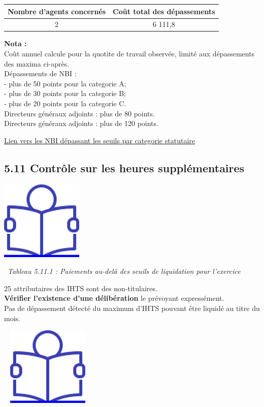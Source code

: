 \begin{longtable}[]{@{}cc@{}}
\toprule
Nombre d'agents concernés & Coût total des dépassements\tabularnewline
\midrule
\endhead
2 & 6 111,8\tabularnewline
\bottomrule
\end{longtable}

\textbf{Nota :}\\
Coût annuel calcule pour la quotite de travail observée, limité aux
dépassements des maxima ci-après.\\
Dépassements de NBI :\\
- plus de 50 points pour la categorie A;\\
- plus de 30 points pour la categorie B;\\
- plus de 20 points pour la categorie C.\\
Directeurs généraux adjoints : plus de 80 points.\\
Directeurs généraux adjoints : plus de 120 points.

\href{../Bases/Reglementation/NBI.cat.irreg.csv}{Lien vers les NBI
dépassant les seuils par categorie statutaire}

\hypertarget{controle-sur-les-heures-supplementaires}{%
\subsection{5.11 Contrôle sur les heures
supplémentaires}\label{controle-sur-les-heures-supplementaires}}

\href{../Docs/Notices/fiche_IHTS.odt}{\includegraphics{icones/Notice.png}}

~\emph{Tableau 5.11.1 : Paiements au-delà des seuils de liquidation pour
l'exercice}

25 attributaires des IHTS sont des non-titulaires.\\
\textbf{Vérifier l'existence d'une délibération} le prévoyant
expressément.\\
Pas de dépassement détecté du maximum d'IHTS pouvant être liquidé au
titre du mois.

~
\href{../Docs/Notices/fiche_liquidation_IHTS.odt}{\includegraphics{icones/Notice.png}}

